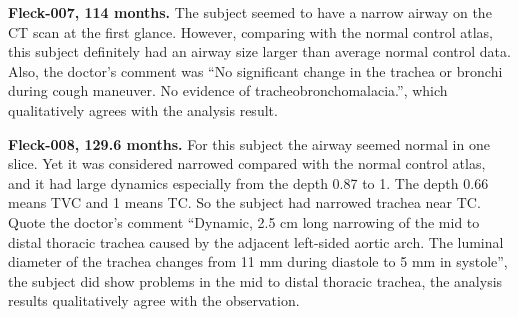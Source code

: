 {\bf Fleck-007, 114 months.}
The subject seemed to have a narrow airway on the CT scan at the first glance.
However, comparing with the normal control atlas, this subject definitely had an airway size larger than average normal control data.
Also, the doctor's comment was ``No significant change in the trachea or bronchi during cough maneuver. No evidence of tracheobronchomalacia.'', which qualitatively agrees with the analysis result.

{\bf Fleck-008, 129.6 months.}
For this subject the airway seemed normal in one slice.
Yet it was considered narrowed compared with the normal control atlas, and it had large dynamics especially from the depth 0.87 to 1.
The depth 0.66 means TVC and 1 means TC.
So the subject had narrowed trachea near TC.
Quote the doctor's comment ``Dynamic, 2.5 cm long narrowing of the mid to distal thoracic trachea caused by the adjacent left-sided aortic arch. The luminal diameter of the trachea changes from 11 mm during diastole to 5 mm in systole'', the subject did show problems in the mid to distal thoracic trachea, the analysis results qualitatively agree with the observation.